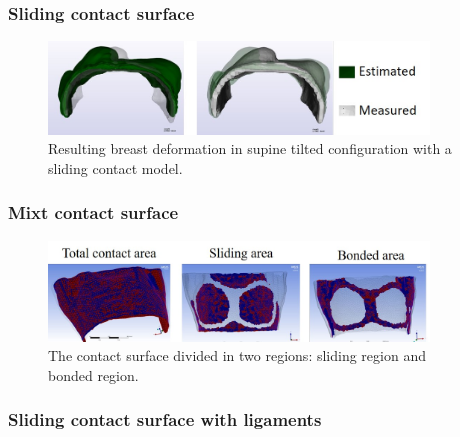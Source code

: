 \subsubsection*{Sliding contact surface}

\begin{figure}[!h]
\centering
\includegraphics[width=0.9\textwidth,keepaspectratio]{figures/supinetilted_sliding.jpg} 
\caption{Resulting breast deformation in supine tilted configuration with a sliding contact model.}
\label{fig:bondedcontact}
\end{figure}

\subsubsection*{Mixt contact surface}

\begin{figure}[!h]
\centering
\includegraphics[width=0.9\textwidth,keepaspectratio]{figures/mixtcontactarea.jpg} 
\caption{The contact surface divided in two regions: sliding region and bonded region.}
\label{fig:bondedcontact}
\end{figure}
\subsubsection*{Sliding contact surface with ligaments}